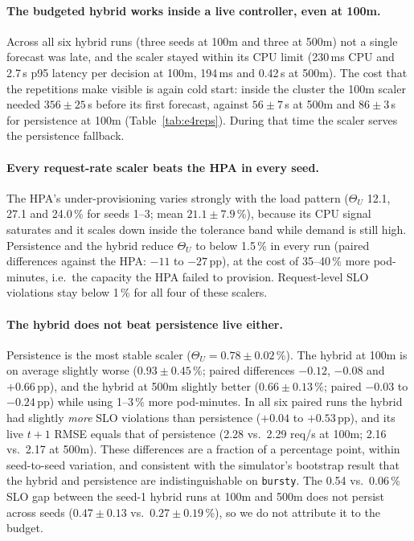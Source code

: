 \documentclass[conference,a4paper]{IEEEtran}
\begin{document}
\paragraph{The budgeted hybrid works inside a live controller, even at 100m.} Across all six hybrid runs
(three seeds at 100m and three at 500m) not a single forecast was late, and the scaler stayed within its CPU limit
(230\,ms CPU and 2.7\,s p95 latency per decision at 100m, 194\,ms and 0.42\,s at 500m). The cost that
the repetitions make visible is again cold start: inside the cluster the 100m scaler needed
$356\pm25$\,s before its first forecast, against $56\pm7$\,s at 500m and $86\pm3$\,s for persistence at 100m
(Table~\ref{tab:e4reps}). During that time the scaler serves the persistence fallback.

\paragraph{Every request-rate scaler beats the HPA in every seed.} The HPA's under-provisioning varies strongly
with the load pattern ($\Theta_U$ 12.1, 27.1 and 24.0\,\% for seeds 1--3; mean $21.1\pm7.9$\,\%), because its CPU
signal saturates and it scales down inside the tolerance band while demand is still high. Persistence and the
hybrid reduce $\Theta_U$ to below 1.5\,\% in every run (paired differences against the HPA: $-11$ to $-27$\,pp),
at the cost of 35--40\,\% more pod-minutes, i.e.\ the capacity the HPA failed to provision. Request-level SLO
violations stay below 1\,\% for all four of these scalers.

\paragraph{The hybrid does not beat persistence live either.} Persistence is the most stable scaler
($\Theta_U=0.78\pm0.02$\,\%). The hybrid at 100m is on average slightly worse ($0.93\pm0.45$\,\%; paired
differences $-0.12$, $-0.08$ and $+0.66$\,pp), and the hybrid at 500m slightly better ($0.66\pm0.13$\,\%; paired
$-0.03$ to $-0.24$\,pp) while using 1--3\,\% more pod-minutes. In all six paired runs the hybrid had slightly
\emph{more} SLO violations than persistence ($+0.04$ to $+0.53$\,pp), and its live $t{+}1$ RMSE equals that of
persistence (2.28 vs.\ 2.29 req/s at 100m; 2.16 vs.\ 2.17 at 500m). These differences are a fraction of a
percentage point, within seed-to-seed variation, and consistent with the simulator's bootstrap result that the
hybrid and persistence are indistinguishable on \texttt{bursty}. The 0.54 vs.\ 0.06\,\% SLO gap between the
seed-1 hybrid runs at 100m and 500m does not persist across seeds ($0.47\pm0.13$ vs.\ $0.27\pm0.19$\,\%), so we
do not attribute it to the budget.
\end{document}
